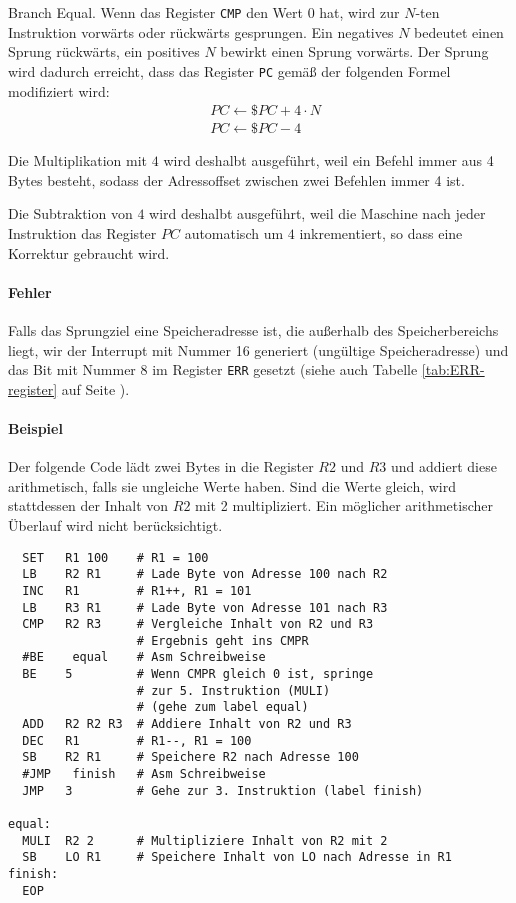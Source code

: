 \glqq Branch Equal\grqq.
Wenn das Register \texttt{CMP} den Wert $0$ hat, wird zur $N$-ten Instruktion
vorwärts oder rückwärts gesprungen. Ein negatives $N$ bedeutet einen Sprung
rückwärts, ein positives $N$ bewirkt einen Sprung vorwärts. Der Sprung wird
dadurch erreicht, dass das Register \texttt{PC} gemäß der folgenden Formel
modifiziert wird:
\begin{align*}
   & PC \gets \$PC + 4 \cdot N \\
   & PC \gets \$PC - 4
\end{align*}

Die Multiplikation mit $4$ wird deshalbt ausgeführt, weil ein Befehl immer aus 4
Bytes besteht, sodass der Adressoffset zwischen zwei Befehlen immer 4 ist.

Die Subtraktion von $4$ wird deshalbt ausgeführt, weil die Maschine nach jeder
Instruktion das Register $PC$ automatisch um $4$ inkrementiert, so dass eine
Korrektur gebraucht wird.

\paragraph{Fehler}
Falls das Sprungziel eine Speicheradresse ist, die außerhalb des
Speicherbereichs liegt, wir der Interrupt mit Nummer 16 generiert (ungültige
Speicheradresse) und das Bit mit Nummer 8 im Register \texttt{ERR} gesetzt
(siehe auch Tabelle \ref{tab:ERR-register} auf Seite
\pageref{tab:ERR-register}).


\paragraph{Beispiel}
Der folgende Code lädt zwei Bytes in die Register $R2$ und $R3$ und addiert
diese arithmetisch, falls sie ungleiche Werte haben. Sind die Werte gleich,
wird stattdessen der Inhalt von $R2$ mit 2 multipliziert. Ein möglicher
arithmetischer Überlauf wird nicht berücksichtigt.
\begin{lstlisting}
  SET   R1 100    # R1 = 100
  LB    R2 R1     # Lade Byte von Adresse 100 nach R2
  INC   R1        # R1++, R1 = 101
  LB    R3 R1     # Lade Byte von Adresse 101 nach R3
  CMP   R2 R3     # Vergleiche Inhalt von R2 und R3
                  # Ergebnis geht ins CMPR
  #BE    equal    # Asm Schreibweise
  BE    5         # Wenn CMPR gleich 0 ist, springe
                  # zur 5. Instruktion (MULI)
                  # (gehe zum label equal)
  ADD   R2 R2 R3  # Addiere Inhalt von R2 und R3
  DEC   R1        # R1--, R1 = 100
  SB    R2 R1     # Speichere R2 nach Adresse 100
  #JMP   finish   # Asm Schreibweise
  JMP   3         # Gehe zur 3. Instruktion (label finish)

equal:
  MULI  R2 2      # Multipliziere Inhalt von R2 mit 2
  SB    LO R1     # Speichere Inhalt von LO nach Adresse in R1
finish:
  EOP
\end{lstlisting}



